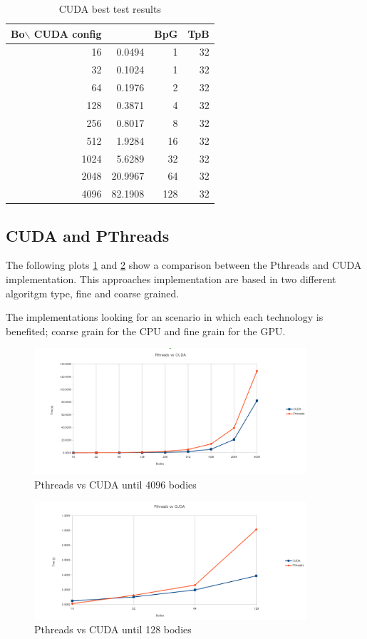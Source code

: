     \begin{table}[h!]
        \centering
        \small
        \begin{tabular}{|r|r|r|r|}
            \hline
            Bo$\backslash$ CUDA config & & BpG & TpB \\ \hline
            16    &   0.0494   &   1  &  32 \\\hline
            32    &   0.1024   &   1  &  32 \\\hline
            64    &   0.1976   &   2  &  32 \\\hline
            128   &   0.3871   &   4  &  32 \\\hline
            256   &   0.8017   &   8  &  32 \\\hline
            512   &   1.9284   &  16  &  32 \\\hline
            1024  &   5.6289   &  32  &  32 \\\hline
            2048  &  20.9967   &  64  &  32 \\\hline
            4096  &  82.1908   & 128  &  32 \\\hline
        \end{tabular}
        \caption{CUDA best test results}
        \label{tab:cuda}
    \end{table}

\subsection{CUDA and PThreads}

The following plots \ref{fig:pthvscuda1} and \ref{fig:pthvscuda2} show a comparison between the Pthreads and CUDA implementation.
This approaches implementation are based in two different algoritgm type,
fine and coarse grained.

The implementations looking for an scenario in which each technology
is benefited; coarse grain for the CPU and fine grain for the GPU.

\begin{figure}
    \centering
    \includegraphics[width=0.9\textwidth]{img/pthvscuda-4096}
    \caption{Pthreads vs CUDA until 4096 bodies}
    \label{fig:pthvscuda1}
\end{figure}

\begin{figure}
    \centering
    \includegraphics[width=0.9\textwidth]{img/pthvscuda-128}
    \caption{Pthreads vs CUDA until 128 bodies}
    \label{fig:pthvscuda2}
\end{figure}
